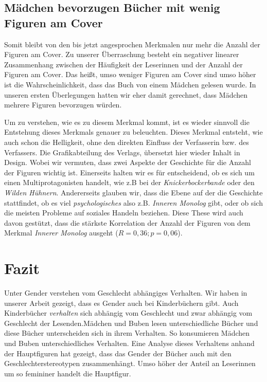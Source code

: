 \section{Mädchen bevorzugen Bücher mit wenig Figuren am Cover}

Somit bleibt von den bis jetzt angesprochen Merkmalen nur mehr die
Anzahl der Figuren am Cover. Zu unserer Überraschung besteht ein
negativer linearer Zusammenhang zwischen der Häufigkeit der Leserinnen
und der Anzahl der Figuren am Cover. Das heißt, umso weniger Figuren am
Cover sind umso höher ist die Wahrscheinlichkeit, dass das Buch von
einem Mädchen gelesen wurde. In unseren ersten Überlegungen hatten wir
eher damit gerechnet, dass Mädchen mehrere Figuren bevorzugen würden.

Um zu verstehen, wie es zu diesem Merkmal kommt, ist es wieder sinnvoll
die Entstehung dieses Merkmals genauer zu beleuchten. Dieses Merkmal
entsteht, wie auch schon die Helligkeit, ohne den direkten Einfluss der
Verfasserin bzw. des Verfassers. Die Grafikabteilung des Verlags,
übersetzt hier wieder Inhalt in Design. Wobei wir vermuten, dass zwei
Aspekte der Geschichte für die Anzahl der Figuren wichtig ist.
Einerseits halten wir es für entscheidend, ob es sich um einen
Multiprotagonisten handelt, wie z.B bei der \emph{Knickerbockerbande}
oder den \emph{Wilden Hühnern}. Andererseits glauben wir, dass die Ebene
auf der die Geschichte stattfindet, ob es viel \emph{psychologisches}
also z.B. \emph{Inneren Monolog} gibt, oder ob sich die meisten Probleme
auf soziales Handeln beziehen. Diese These wird auch davon gestützt,
dass die stärkste Korrelation der Anzahl der Figuren von dem Merkmal
\emph{Innerer Monolog} ausgeht ($R=0{,}36; p=0{,}06$).

\chapter{Fazit}

Unter Gender verstehen  vom Geschlecht
abhängiges Verhalten. Wir haben in unserer Arbeit gezeigt, dass es
Gender auch bei Kinderbüchern gibt. Auch Kinderbücher \emph{verhalten}
sich abhängig vom Geschlecht und zwar abhängig vom Geschlecht der
Lesenden.Mädchen und Buben lesen unterschiedliche Bücher und diese
Bücher unterscheiden sich in ihrem Verhalten. So konsumieren Mädchen und
Buben unterschiedliches Verhalten. Eine Analyse dieses Verhaltens anhand
der Hauptfiguren hat gezeigt, dass das Gender der Bücher auch mit den
Geschlechterstereotypen zusammenhängt. Umso höher der Anteil an
Leserinnen um so femininer handelt die Hauptfigur.

